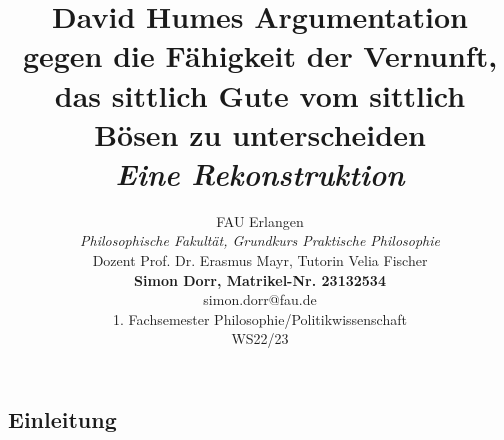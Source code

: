 \documentclass[ngerman,12pt]{diazessay} %
\title{\textbf{David Humes Argumentation gegen die Fähigkeit der Vernunft, das sittlich Gute vom sittlich Bösen zu unterscheiden} \\
\vspace{3em}
{\Large\itshape Eine Rekonstruktion \vspace{4em}}} %
\author{
FAU Erlangen \\
\textit{Philosophische Fakultät, Grundkurs Praktische Philosophie} \\
Dozent Prof. Dr. Erasmus Mayr, Tutorin Velia Fischer \\
\textbf{Simon Dorr, Matrikel-Nr. 23132534} \\
simon.dorr@fau.de \\
1. Fachsemester Philosophie/Politikwissenschaft \\
WS22/23
} %
\begin{document}
\begin{doublespace}
\maketitle %
\newpage


\tableofcontents
\newpage

\section{Einleitung}


\end{doublespace}
\end{document}
